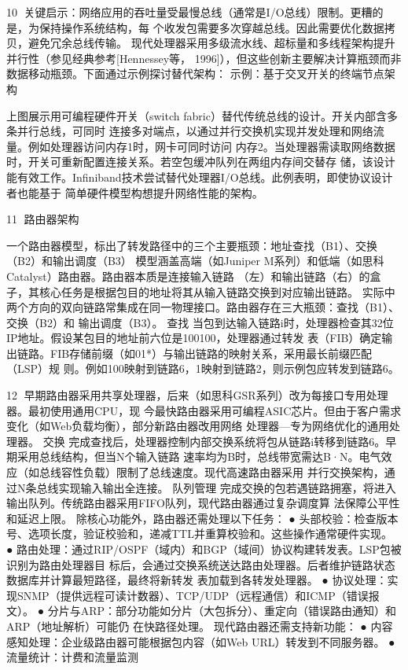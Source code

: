                                                        10
关键启示：网络应用的吞吐量受最慢总线（通常是I/O总线）限制。更糟的是，为保持操作系统结构，每
个收发包需要多次穿越总线。因此需要优化数据拷贝，避免冗余总线传输。
现代处理器采用多级流水线、超标量和多线程架构提升并行性（参见经典参考[Hennessey等，
1996]），但这些创新主要解决计算瓶颈而非数据移动瓶颈。下面通过示例探讨替代架构：
示例：基于交叉开关的终端节点架构




上图展示用可编程硬件开关（switch fabric）替代传统总线的设计。开关内部含多条并行总线，可同时
连接多对端点，以通过并行交换机实现并发处理和网络流量。例如处理器访问内存1时，网卡可同时访问
内存2。当处理器需读取网络数据时，开关可重新配置连接关系。若空包缓冲队列在两组内存间交替存
储，该设计能有效工作。Infiniband技术尝试替代处理器I/O总线。此例表明，即使协议设计者也能基于
简单硬件模型构想提升网络性能的架构。

                                                   11
路由器架构




一个路由器模型，标出了转发路径中的三个主要瓶颈：地址查找（B1）、交换（B2）和输出调度（B3）
模型涵盖高端（如Juniper M系列）和低端（如思科Catalyst）路由器。路由器本质是连接输入链路
（左）和输出链路（右）的盒子，其核心任务是根据包目的地址将其从输入链路交换到对应输出链路。
实际中两个方向的双向链路常集成在同一物理接口。路由器存在三大瓶颈：查找（B1）、交换（B2）和
输出调度（B3）。
查找
当包到达输入链路i时，处理器检查其32位IP地址。假设某包目的地址前六位是100100，处理器通过转发
表（FIB）确定输出链路。FIB存储前缀（如01*）与输出链路的映射关系，采用最长前缀匹配（LSP）规
则。例如100映射到链路6，1映射到链路2，则示例包应转发到链路6。




                                                  12
早期路由器采用共享处理器，后来（如思科GSR系列）改为每接口专用处理器。最初使用通用CPU，现
今最快路由器采用可编程ASIC芯片。但由于客户需求变化（如Web负载均衡），部分新路由器改用网络
处理器—专为网络优化的通用处理器。
交换
完成查找后，处理器控制内部交换系统将包从链路i转移到链路6。早期采用总线结构，但当N个输入链路
速率均为B时，总线带宽需达B·N。电气效应（如总线容性负载）限制了总线速度。现代高速路由器采用
并行交换架构，通过N条总线实现输入输出全连接。
队列管理
完成交换的包若遇链路拥塞，将进入输出队列。传统路由器采用FIFO队列，现代路由器通过复杂调度算
法保障公平性和延迟上限。
除核心功能外，路由器还需处理以下任务：
 ● 头部校验：检查版本号、选项长度，验证校验和，递减TTL并重算校验和。这些操作通常硬件实现。
 ● 路由处理：通过RIP/OSPF（域内）和BGP（域间）协议构建转发表。LSP包被识别为路由处理器目
    标后，会通过交换系统送达路由处理器。后者维护链路状态数据库并计算最短路径，最终将新转发
    表加载到各转发处理器。
 ● 协议处理：实现SNMP（提供远程可读计数器）、TCP/UDP（远程通信）和ICMP（错误报文）。
 ● 分片与ARP：部分功能如分片（大包拆分）、重定向（错误路由通知）和ARP（地址解析）可能仍
    在快路径处理。
现代路由器还需支持新功能：
 ● 内容感知处理：企业级路由器可能根据包内容（如Web URL）转发到不同服务器。
 ● 流量统计：计费和流量监测

